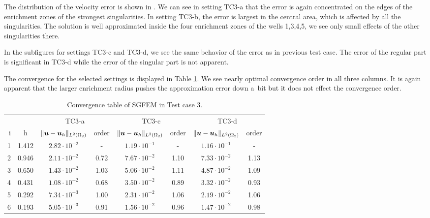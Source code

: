 The distribution of the velocity error is shown in . 
We can see in setting TC3-a that the error is again concentrated on the edges of the enrichment zones of
the strongest singularities. In setting TC3-b, the error is largest in the central area, 
which is affected by all the singularities. The solution is well approximated inside the four enrichment zones
of the wells 1,3,4,5, we see only small effects of the other singularities there.

In the subfigures for settings TC3-c and TC3-d, we see the same behavior of the error as in previous test case.
The error of the regular part is significant in TC3-d while the error of the singular part is not apparent.

The convergence for the selected settings is displayed in Table \ref{tab:mh_tc3_convergence}.
We see nearly optimal convergence order in all three columns. It is again apparent that
the larger enrichment radius pushes the approximation error down a~bit but it does not effect the
convergence order.

\begin{table}[!htb]
\begin{center}
\bgroup
\def\arraystretch{1.2}
\setlength\tabcolsep{5pt}
\begin{tabular}{rc|cc|cc|cc}
\toprule
\multicolumn{2}{c|}{} & \multicolumn{2}{c|}{ TC3-a } & \multicolumn{2}{c|}{ TC3-c } & \multicolumn{2}{c}{TC3-d}\\ [3pt] %
i & h & $\|\mathbf{\boldsymbol{u}}-\mathbf{\boldsymbol{u}}_h\|_{L^2(\Omega_2)}$ & order & $\|\mathbf{\boldsymbol{u}}-\mathbf{\boldsymbol{u}}_h\|_{L^2(\Omega_2)}$
    & order & $\|\mathbf{\boldsymbol{u}}-\mathbf{\boldsymbol{u}}_h\|_{L^2(\Omega_2)}$ & order \\ [3pt] \midrule
1 & 1.412 & $2.82\cdot10^{-2}$  &  -   & $1.19\cdot10^{-1}$  &  -   & $1.16\cdot10^{-1}$ &   -   \\
2 & 0.946 & $2.11\cdot10^{-2}$  & 0.72 & $7.67\cdot10^{-2}$  & 1.10 & $7.33\cdot10^{-2}$ &  1.13 \\
3 & 0.650 & $1.43\cdot10^{-2}$  & 1.03 & $5.06\cdot10^{-2}$  & 1.11 & $4.87\cdot10^{-2}$ &  1.09 \\
4 & 0.431 & $1.08\cdot10^{-2}$  & 0.68 & $3.50\cdot10^{-2}$  & 0.89 & $3.32\cdot10^{-2}$ &  0.93 \\
5 & 0.292 & $7.34\cdot10^{-3}$  & 1.00 & $2.31\cdot10^{-2}$  & 1.06 & $2.19\cdot10^{-2}$ &  1.06 \\
6 & 0.193 & $5.05\cdot10^{-3}$  & 0.91 & $1.56\cdot10^{-2}$  & 0.96 & $1.47\cdot10^{-2}$ &  0.98 \\
\bottomrule
\end{tabular}
\caption{Convergence table of SGFEM in Test case 3.}
\label{tab:mh_tc3_convergence}
\egroup
\end{center}
\end{table}

